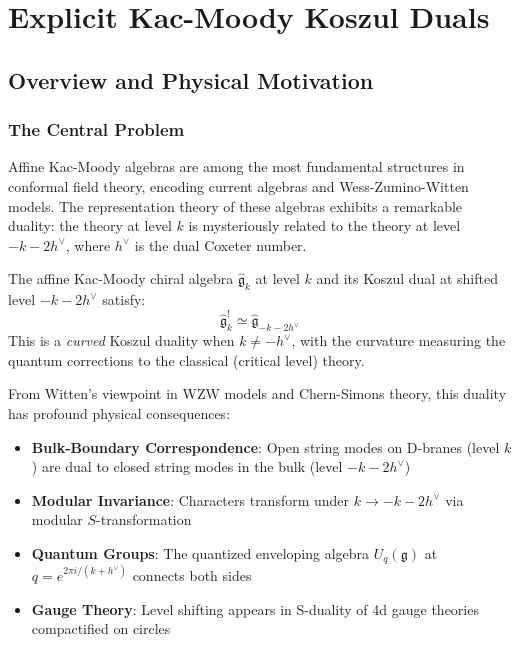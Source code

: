 \chapter{Explicit Kac-Moody Koszul Duals}\label{chap:kac-moody-koszul}

\section{Overview and Physical Motivation}

\subsection{The Central Problem}

Affine Kac-Moody algebras are among the most fundamental structures in conformal field theory, encoding current algebras and Wess-Zumino-Witten models. The representation theory of these algebras exhibits a remarkable duality: the theory at level $k$ is mysteriously related to the theory at level $-k - 2h^\vee$, where $h^\vee$ is the dual Coxeter number.

\begin{principle}
The affine Kac-Moody chiral algebra $\widehat{\mathfrak{g}}_k$ at level $k$ and its Koszul dual at shifted level $-k - 2h^\vee$ satisfy:
\begin{equation}\label{eq:kac-moody-koszul-basic}
\boxed{\widehat{\mathfrak{g}}_k^! \simeq \widehat{\mathfrak{g}}_{-k-2h^\vee}}
\end{equation}
This is a \emph{curved} Koszul duality when $k \neq -h^\vee$, with the curvature measuring the quantum corrections to the classical (critical level) theory.
\end{principle}

\begin{remark}
From Witten's viewpoint in WZW models and Chern-Simons theory, this duality has profound physical consequences:
\begin{itemize}
\item \textbf{Bulk-Boundary Correspondence}: Open string modes on D-branes (level $k$) are dual to closed string modes in the bulk (level $-k-2h^\vee$)
\item \textbf{Modular Invariance}: Characters transform under $k \to -k-2h^\vee$ via modular $S$-transformation
\item \textbf{Quantum Groups}: The quantized enveloping algebra $U_q(\mathfrak{g})$ at $q = e^{2\pi i/(k+h^\vee)}$ connects both sides
\item \textbf{Gauge Theory}: Level shifting appears in S-duality of 4d gauge theories compactified on circles
\end{itemize}
\end{remark}

